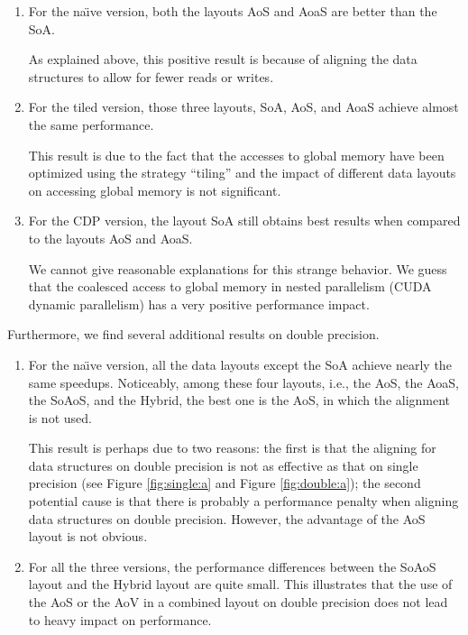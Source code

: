 \begin{enumerate}
\item For the na\"{\i}ve version, both the layouts AoS and AoaS are better than the SoA.

As explained above, this positive result is because of aligning the data 
structures to allow for fewer reads or writes. 

\item For the tiled version, those three layouts, SoA, AoS, and AoaS achieve almost the same performance. 

This result is due to the fact that the accesses to global memory have been 
optimized using the strategy ``tiling'' and the impact of different data 
layouts on accessing global memory is not significant. 


\item For the CDP version, the layout SoA still obtains best results when compared to the layouts AoS and AoaS.

We cannot give reasonable explanations for this strange behavior. We guess 
that the coalesced access to global memory in nested parallelism (CUDA 
dynamic parallelism) has a very positive performance impact. 

\end{enumerate}

Furthermore, we find several additional results on double precision. 

\begin{enumerate}
\item For the na\"{\i}ve version, all the data layouts except the SoA achieve nearly the same speedups. Noticeably, among these four layouts, i.e., the AoS, the AoaS, the SoAoS, and the Hybrid, the best one is the AoS, in which the alignment is not used. 

This result is perhaps due to two reasons: the first is that the aligning for data structures on double precision is not as effective as that on single precision (see Figure \ref{fig:single:a} and Figure \ref{fig:double:a}); the second potential cause is that there is probably a performance penalty when aligning data structures on double precision. However, the advantage of the AoS layout is not obvious.

\item For all the three versions, the performance differences between the SoAoS layout and the Hybrid layout are quite small. This illustrates that the use of the AoS or the AoV in a combined layout on double precision does not lead to heavy impact on performance. 
\end{enumerate}

